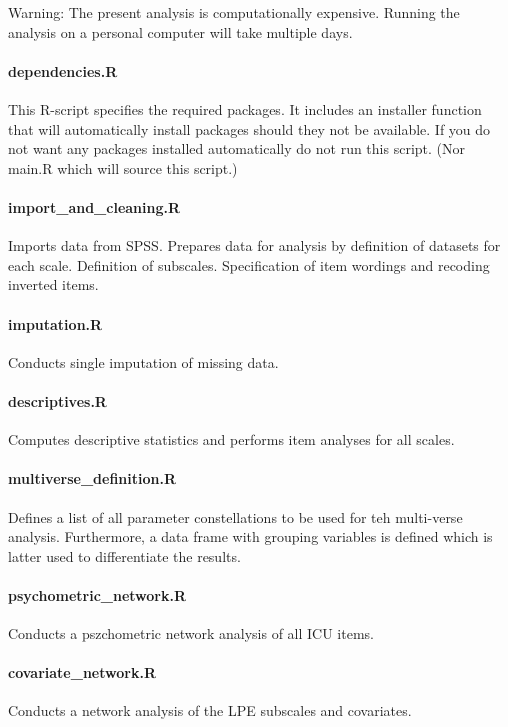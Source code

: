 \documentclass[a4paper,12pt]{article} %
\begin{document}
Warning: The present analysis is computationally expensive.
Running the analysis on a personal computer will take multiple days.

\paragraph{dependencies.R}
This R-script specifies the required packages.
It includes an installer function that will automatically install packages should they not be available.
If you do not want any packages installed automatically do not run this script. (Nor main.R which will source this script.)

\paragraph{import\_and\_cleaning.R}
Imports data from SPSS. Prepares data for analysis by definition of datasets for each scale. Definition of subscales.
Specification of item wordings and recoding inverted items.

\paragraph{imputation.R}
Conducts single imputation of missing data.

\paragraph{descriptives.R}
Computes descriptive statistics and performs item analyses for all scales.

\paragraph{multiverse\_definition.R}
Defines a list of all parameter constellations to be used for teh multi-verse analysis.
Furthermore, a data frame with grouping variables is defined which is latter used to 	differentiate the results.

\paragraph{psychometric\_network.R}
Conducts a pszchometric network analysis of all ICU items.

\paragraph{covariate\_network.R}
Conducts a network analysis of the LPE subscales and covariates.
\end{document}
